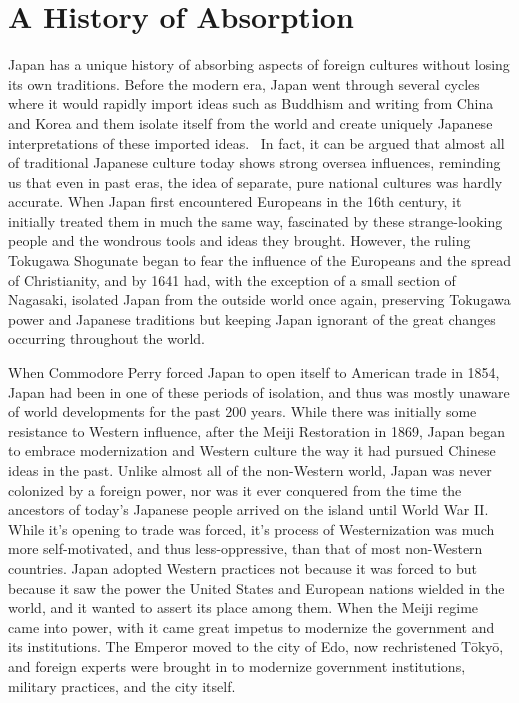 \documentclass[12pt]{article}
\begin{document}
\section{A History of Absorption}

Japan has a unique history of absorbing aspects of foreign cultures without losing its own traditions.  Before the modern era, Japan went through several cycles where it would rapidly import ideas such as Buddhism and writing from China and Korea and them isolate itself from the world and create uniquely Japanese interpretations of these imported ideas.~\cSurface{\citep[pg.\ 48]}
In fact, it can be argued that almost all of traditional Japanese culture today shows strong oversea influences, reminding us that even in past eras, the idea of separate, pure national cultures was hardly accurate.  When Japan first encountered Europeans in the 16th century, it initially treated them in much the same way, fascinated by these strange-looking people and the wondrous tools and ideas they brought.  However, the ruling Tokugawa Shogunate began to fear the influence of the Europeans and the spread of Christianity, and by 1641 had, with the exception of a small section of Nagasaki, isolated Japan from the outside world once again, preserving Tokugawa power and Japanese traditions but keeping Japan ignorant of the great changes occurring throughout the world.

When Commodore Perry forced Japan to open itself to American trade in 1854, Japan had been in one of these periods of isolation, and thus was mostly unaware of world developments for the past 200 years.  While there was initially some resistance to Western influence, after the Meiji Restoration in 1869, Japan began to embrace modernization and Western culture the way it had pursued Chinese ideas in the past.
Unlike almost all of the non-Western world, Japan was never colonized by a foreign power, nor was it ever conquered from the time the ancestors of today's Japanese people arrived on the island until World War II.  While it's opening to trade was forced, it's process of Westernization was much more self-motivated, and thus less-oppressive, than that of most non-Western countries.  Japan adopted Western practices not because it was forced to but because it saw the power the United States and European nations wielded in the world, and it wanted to assert its place among them.  When the Meiji regime came into power, with it came great impetus to modernize the government and its institutions.  The Emperor moved to the city of Edo, now rechristened T\=oky\=o, and foreign experts were brought in to modernize government institutions, military practices, and the city itself.
\end{document}

